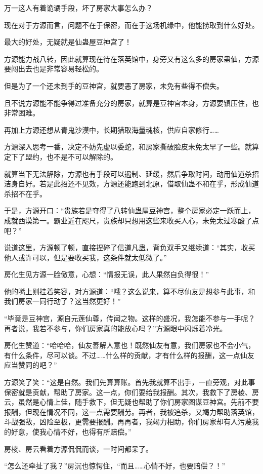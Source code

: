 \begin{this_body}
万一这人有着诡谲手段，坏了房家大事怎么办？

现在对于方源而言，问题不在于保密，而在于这场机缘中，他能捞取到什么好处。

最大的好处，无疑就是仙蛊屋豆神宫了！

方源能力战八转，因此就算现在待在落英馆中，身旁又有这么多的房家蛊仙，方源要闯出去也是非常容易轻松的。

但是为了一个还未到手的豆神宫，就要恶了房家，未免有些得不偿失。

且不说方源能不能争得过准备充分的房家，就算是豆神宫本身，方源要镇压住，也非常困难。

再加上方源还想从青鬼沙漠中，长期猎取海量魂核，供应自家修行……

方源深入思考一番，决定不妨先虚以委蛇，和房家撕破脸皮未免太早了一些。就算定下了盟约，也不是不可以解除的。

就算当下无法解除，方源也有手段可以遏制、延缓，然后争取时间，动用仙道杀招洁身自好。若是此招还不见效，方源还能跑到北原，借取仙蛊不和在乎，形成仙道杀招不在乎。

于是，方源开口：“贵族若是夺得了八转仙蛊屋豆神宫，整个房家必定一跃而上，成就西漠第一。霸业近在咫尺，贵族却只想用这些来收买人心，未免太过寒酸了点吧？”

说道这里，方源顿了顿，直接捏碎了信道凡蛊，背负双手又继续道：“其实，收买他人或许可以，但是要收买我，这条件就太低微了。”

房化生见方源一脸傲意，心想：“情报无误，此人果然自负得很！”

他的嘴上则挂着笑容，对方源道：“哦？这么说来，算不尽仙友是想参与此事，和我们房家一同行动了？这当然更好！”

“毕竟是豆神宫，源自元莲仙尊，传闻之物。这样的盛况，我怎能不参与一手呢？再者说，我若不参与，你们房家真的能放心吗？”方源眼中闪烁着冷光。

房化生赞道：“哈哈哈，仙友善解人意也！既然仙友有意，我们房家也不会小气，有什么条件，尽可以谈。不过……什么样的贡献，才有什么样的报酬，这一点仙友应当赞同的吧？”

方源笑了笑：“这是自然。我们先算算账。首先我就算不出手，一直旁观，对此事保密就是贡献，帮助了房家。这一点，你们要给我报酬。其次，我救下了房棱、房云，虽然是心情上佳，随手救下，但无疑也帮助了你们房家图谋豆神宫。先前不要报酬，但现在情况不同，这一点需要酬劳。再者，我被追杀，又竭力帮助落英馆，斗战强敌，凶险至极，更需要报酬。再再者，我竭力相助，你们房家却有人污蔑我的好意，使我心情不好，也得有所赔偿。”

房棱、房云看着方源侃侃而谈，一时间都呆了。

“怎么还牵扯了我？”房沉也惊愕住，“而且……心情不好，也要赔偿？！”


\end{this_body}

